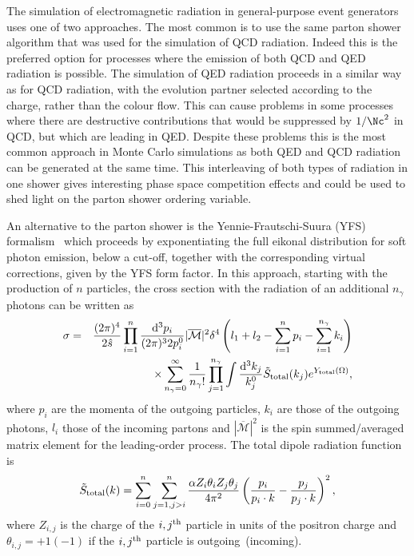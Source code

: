 The simulation of electromagnetic radiation in general-purpose event generators
uses one of two approaches. The most common is to use the same parton
shower algorithm that was used for the simulation of QCD radiation. Indeed this 
is the preferred option for processes where the emission of
both QCD and QED radiation is possible. The simulation
of QED radiation proceeds in a similar way as for QCD radiation, with the evolution
partner selected according to the charge, rather than the colour flow. This
can cause problems in some processes where there are destructive contributions
that would be suppressed by $1/\Nc^2$ in QCD, but which are leading in QED.
Despite these problems this is the most common approach in Monte Carlo simulations
as both QED and QCD radiation can be generated at the same time.
This interleaving of both types of radiation in one shower gives
interesting phase space competition effects and could be used
to shed light on the parton shower ordering
variable\cite{Seymour:1994bx}.

An alternative to the parton shower is the Yennie-Frautschi-Suura (YFS) formalism~\cite{Yennie:1961ad}
which proceeds by exponentiating the full eikonal distribution for
soft photon emission, below a cut-off,
together with the corresponding virtual corrections, given by the YFS form factor.
In this approach, starting with the production of
$n$ particles, the cross section with the radiation of
an additional $n_\gamma$ photons can be written as 
\begin{eqnarray}
\sigma  
&=& 
\displaystyle{\frac{(2\pi)^4}{2\hat{s}}
\prod_{i=1}^{n} \frac{{\rm d}^3p_i}{(2\pi)^32p_i^0}
|\overline{\mathcal{M}}|^2
\delta^4\left(l_1+l_2-\sum_{i=1}^np_i-\sum_{i=1}^{n_\gamma}k_i\right)}
\label{eqn:YFSmaster} \\
&&\displaystyle{\times
\sum^\infty_{n_\gamma=0}\frac1{n_\gamma!}\prod_{j=1}^{n_\gamma}\int 
\frac{{\rm d}^3k_j}{k_j^0}\tilde{S}_{\rm total}(k_j)}
 e^{Y_{\rm total}(\Omega)},
\nonumber
\end{eqnarray}
where $p_i$ are the momenta of the outgoing particles, $k_i$ are those
of the outgoing photons, $l_i$ those of the incoming partons and
 $|\overline{\mathcal{M}}|^2$ is the 
spin summed/averaged matrix element for the leading-order process.
  The total dipole radiation function is
\begin{equation}
\tilde{S}_{\rm total}(k) = \sum_{i=0}^n\sum_{j=1,j>i}^n \frac{\alpha Z_i\theta_iZ_j\theta_j}{4\pi^2}
\left(\frac{p_i}{p_i\cdot k}-\frac{p_j}{p_j\cdot k}\right)^2,
\end{equation}
  where $Z_{i,j}$ is the charge of the $i,j^{\rm th}$ particle in units 
  of the positron charge and \mbox{$\theta_{i,j}=+1(-1)$} if the $i,j^{\rm th}$ particle is
  outgoing~(incoming).

